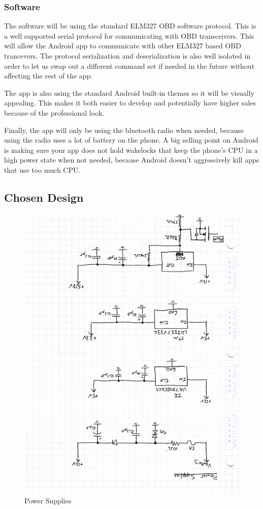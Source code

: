 \documentclass[12pt,letterpaper]{article}
\begin{document}
\subsubsection{Software}
The software will be using the standard ELM327 OBD software protocol. This is a well supported serial protocol for communicating with OBD transceivers. This will allow the Android app to communicate with other ELM327 based OBD trancevers. The protocol serialization and deserialization is also well isolated in order to let us swap out a different command set if needed in the future without affecting the rest of the app. 


The app is also using the standard Android built-in themes so it will be visually appealing. This makes it both easier to develop and potentially have higher sales because of the professional look. 

Finally, the app will only be using the bluetooth radio when needed, because using the radio uses a lot of battery on the phone. A big selling point on Android is making sure your app does not hold wakelocks that keep the phone's CPU in a high power state when not needed, because Android doesn't aggressively kill apps that use too much CPU.

\subsection{Chosen Design}
\begin{figure}[H]
\centering
\includegraphics[page=1, totalheight=20cm, angle=180]{images/circuit_sch.pdf}
\caption{Power Supplies}
\label{fig:ps}
\end{figure}
\end{document}
